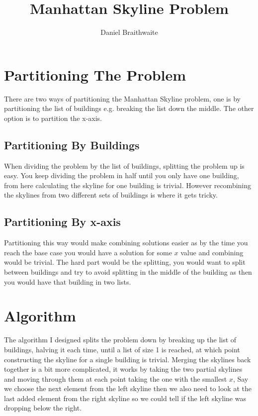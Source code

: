 \documentclass{article}
\title{Manhattan Skyline Problem}
\author{Daniel Braithwaite}
\begin{document}
	\maketitle
	\newpage
  	
	\section{Partitioning The Problem}
		There are two ways of partitioning the Manhattan Skyline problem, one is by partitioning the list of buildings e.g. breaking the list down the middle. The other option is to partition the x-axis.
	
		\subsection{Partitioning By Buildings}
			When dividing the problem by the list of buildings, splitting the problem up is easy. You keep dividing the problem in half until you only have one building, from here calculating the skyline for one building is trivial. However recombining the skylines from two different sets of buildings is where it gets tricky.
			
		\subsection{Partitioning By x-axis}
			Partitioning this way would make combining solutions easier as by the time you reach the base case you would have a solution for some $x$ value and combining would be trivial. The hard part would be the splitting, you would want to split between buildings and try to avoid splitting in the middle of the building as then you would have that building in two lists.
		
	\section{Algorithm}
		The algorithm I designed splits the problem down by breaking up the list of buildings, halving it each time, until a list of size 1 is reached, at which point constructing the skyline for a single building is trivial. Merging the skylines back together is a bit more complicated, it works by taking the two partial skylines and moving through them at each point taking the one with the smallest $x$, Say we choose the next element from the left skyline then we also need to look at the last added element from the right skyline so we could tell if the left skyline was dropping below the right.\newline\newline
		
\end{document}
